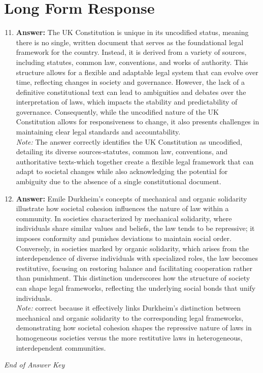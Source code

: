\documentclass[12pt]{article}
\begin{document}
\section*{Long Form Response}
\begin{enumerate}[label=\arabic*.]
\setcounter{enumi}{10}
\item \textbf{Answer:} The UK Constitution is unique in its uncodified status, meaning there is no single, written document that serves as the foundational legal framework for the country. Instead, it is derived from a variety of sources, including statutes, common law, conventions, and works of authority. This structure allows for a flexible and adaptable legal system that can evolve over time, reflecting changes in society and governance. However, the lack of a definitive constitutional text can lead to ambiguities and debates over the interpretation of laws, which impacts the stability and predictability of governance. Consequently, while the uncodified nature of the UK Constitution allows for responsiveness to change, it also presents challenges in maintaining clear legal standards and accountability.
\\ \textit{Note:} The answer correctly identifies the UK Constitution as uncodified, detailing its diverse sources-statutes, common law, conventions, and authoritative texts-which together create a flexible legal framework that can adapt to societal changes while also acknowledging the potential for ambiguity due to the absence of a single constitutional document.
\item \textbf{Answer:} Emile Durkheim's concepts of mechanical and organic solidarity illustrate how societal cohesion influences the nature of law within a community. In societies characterized by mechanical solidarity, where individuals share similar values and beliefs, the law tends to be repressive; it imposes conformity and punishes deviations to maintain social order. Conversely, in societies marked by organic solidarity, which arises from the interdependence of diverse individuals with specialized roles, the law becomes restitutive, focusing on restoring balance and facilitating cooperation rather than punishment. This distinction underscores how the structure of society can shape legal frameworks, reflecting the underlying social bonds that unify individuals.
\\ \textit{Note:} correct because it effectively links Durkheim's distinction between mechanical and organic solidarity to the corresponding legal frameworks, demonstrating how societal cohesion shapes the repressive nature of laws in homogeneous societies versus the more restitutive laws in heterogeneous, interdependent communities.
\end{enumerate}

\vfill
\noindent\textit{End of Answer Key}
\end{document}
